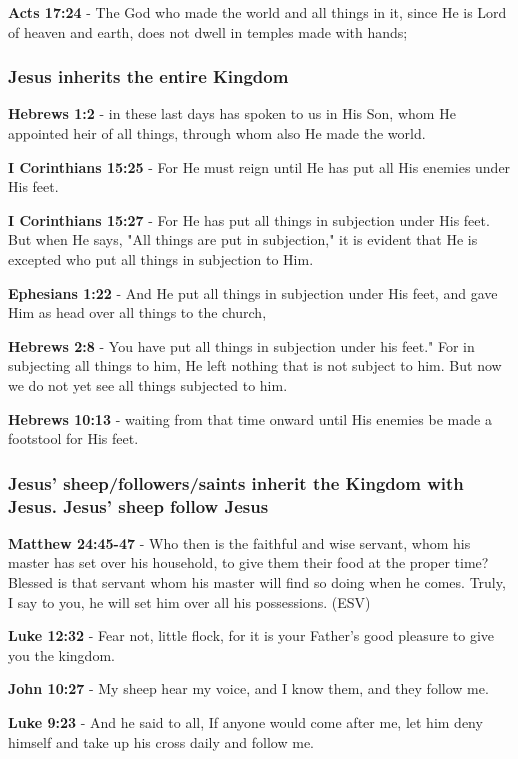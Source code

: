 \documentclass[11pt]{article}
\begin{document}
\textbf{Acts 17:24} - The God who made the world and all things in it, since He is Lord of heaven and earth, does not dwell in temples made with hands;

\subsubsection{Jesus inherits the entire Kingdom}
\label{sec:orga7ced4e}
\textbf{Hebrews 1:2} - in these last days has spoken to us in His Son, whom He appointed heir of all things, through whom also He made the world.

\textbf{I Corinthians 15:25} - For He must reign until He has put all His enemies under His feet.

\textbf{I Corinthians 15:27} - For He has put all things in subjection under His feet. But when He says, "All things are put in subjection," it is evident that He is excepted who put all things in subjection to Him.

\textbf{Ephesians 1:22} - And He put all things in subjection under His feet, and gave Him as head over all things to the church,

\textbf{Hebrews 2:8} - You have put all things in subjection under his feet." For in subjecting all things to him, He left nothing that is not subject to him. But now we do not yet see all things subjected to him.

\textbf{Hebrews 10:13} - waiting from that time onward until His enemies be made a footstool for His feet.

\subsubsection{Jesus' sheep/followers/saints inherit the Kingdom with Jesus. Jesus' sheep follow Jesus}
\label{sec:orge2a8512}
\textbf{Matthew 24:45-47} - Who then is the faithful and wise servant, whom his master has set over his household, to give them their food at the proper time? Blessed is that servant whom his master will find so doing when he comes. Truly, I say to you, he will set him over all his possessions. (ESV)

\textbf{Luke 12:32} - Fear not, little flock, for it is your Father's good pleasure to give you the kingdom.

\textbf{John 10:27} - My sheep hear my voice, and I know them, and they follow me.

\textbf{Luke 9:23} - And he said to all, If anyone would come after me, let him deny himself and take up his cross daily and follow me.
\end{document}
